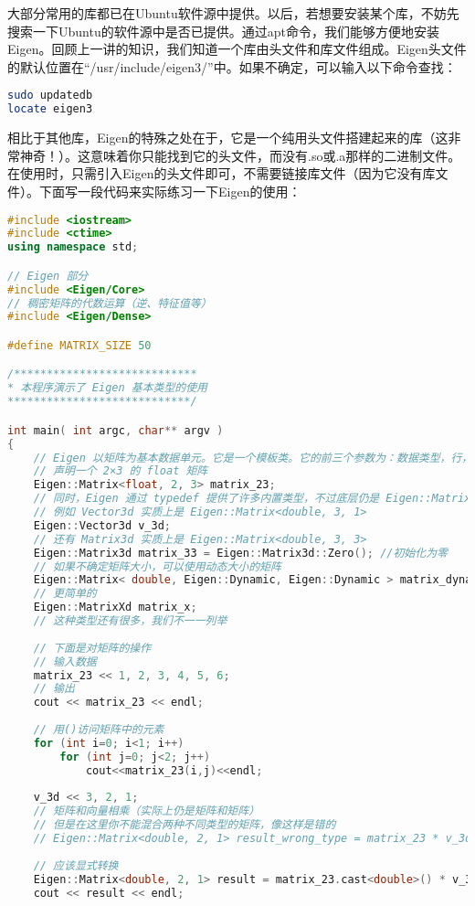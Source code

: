 大部分常用的库都已在Ubuntu软件源中提供。以后，若想要安装某个库，不妨先搜索一下Ubuntu的软件源中是否已提供。通过apt命令，我们能够方便地安装Eigen。回顾上一讲的知识，我们知道一个库由头文件和库文件组成。Eigen头文件的默认位置在“/usr/include/eigen3/”中。如果不确定，可以输入以下命令查找：
\begin{lstlisting}[language=sh]
sudo updatedb
locate eigen3
\end{lstlisting}
相比于其他库，Eigen的特殊之处在于，它是一个纯用头文件搭建起来的库（这非常神奇！）。这意味着你只能找到它的头文件，而没有.so或.a那样的二进制文件。在使用时，只需引入Eigen的头文件即可，不需要链接库文件（因为它没有库文件）。下面写一段代码来实际练习一下Eigen的使用：

\begin{lstlisting}[language=c++,caption=slambook/ch3/useEigen/eigenMatrix.cpp]
#include <iostream>
#include <ctime>
using namespace std;

// Eigen 部分
#include <Eigen/Core>
// 稠密矩阵的代数运算（逆、特征值等）
#include <Eigen/Dense>

#define MATRIX_SIZE 50

/****************************
* 本程序演示了 Eigen 基本类型的使用
****************************/

int main( int argc, char** argv )
{
	// Eigen 以矩阵为基本数据单元。它是一个模板类。它的前三个参数为：数据类型，行，列
	// 声明一个 2×3 的 float 矩阵
	Eigen::Matrix<float, 2, 3> matrix_23;
	// 同时，Eigen 通过 typedef 提供了许多内置类型，不过底层仍是 Eigen::Matrix
	// 例如 Vector3d 实质上是 Eigen::Matrix<double, 3, 1>
	Eigen::Vector3d v_3d;
	// 还有 Matrix3d 实质上是 Eigen::Matrix<double, 3, 3>
	Eigen::Matrix3d matrix_33 = Eigen::Matrix3d::Zero(); //初始化为零
	// 如果不确定矩阵大小，可以使用动态大小的矩阵
	Eigen::Matrix< double, Eigen::Dynamic, Eigen::Dynamic > matrix_dynamic;
	// 更简单的
	Eigen::MatrixXd matrix_x; 
	// 这种类型还有很多，我们不一一列举
	
	// 下面是对矩阵的操作
	// 输入数据
	matrix_23 << 1, 2, 3, 4, 5, 6;
	// 输出
	cout << matrix_23 << endl;
	
	// 用()访问矩阵中的元素
	for (int i=0; i<1; i++)
		for (int j=0; j<2; j++)
			cout<<matrix_23(i,j)<<endl;
	
	v_3d << 3, 2, 1;
	// 矩阵和向量相乘（实际上仍是矩阵和矩阵）
	// 但是在这里你不能混合两种不同类型的矩阵，像这样是错的
	// Eigen::Matrix<double, 2, 1> result_wrong_type = matrix_23 * v_3d;
	
	// 应该显式转换
	Eigen::Matrix<double, 2, 1> result = matrix_23.cast<double>() * v_3d;
	cout << result << endl;
	

\end{lstlisting}
